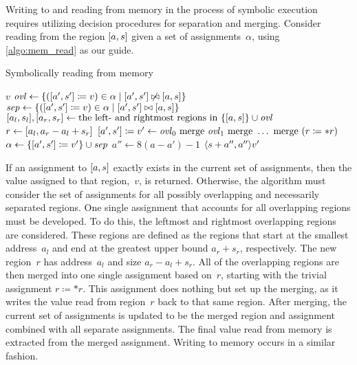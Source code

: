 Writing to and reading from memory in the process of symbolic execution
requires utilizing decision procedures for separation and merging.
Consider reading from the region $[a,s]$ given a set of assignments~$\alpha$,
using \cref{algo:mem_read} as our guide.
\begin{algorithm}
  \caption{Symbolically reading from memory}\label{algo:mem_read}
  \begin{algorithmic}
        \State\Return $v$
      \Else
        \State $\mathit{ovl}\gets\{([a',s']\coloneqq v)\in
          \alpha\mid[a',s']\not\bowtie[a,s]\}$
        \State $\mathit{sep}\gets\{([a',s']\coloneqq v)\in
          \alpha\mid[a',s']\bowtie[a,s]\}$
        \State $[a_l,s_l],[a_r,s_r]\gets
        \text{the left- and rightmost regions in }\{[a,s]\}\cup\mathit{ovl}$
        \State $r\gets[a_l,a_r-a_l+s_r]$
        \State $[a',s']\coloneqq v'\gets
          \mathit{ovl}_0\text{ merge }\mathit{ovl}_1\text{ merge }\ldots\text{ merge }(r\coloneqq *r)$
        \State $\alpha\gets\{[a',s']\coloneqq v'\}\cup\mathit{sep}$
        \State $a''\gets8(a-a')-1$
        \State\Return $\langle s+a'',a''\rangle v'$
      \EndIf
    \EndFunction
  \end{algorithmic}
\end{algorithm}
If an assignment to $[a,s]$ exactly exists in the current set of assignments,
then the value assigned to that region,~$v$, is returned.
Otherwise, the algorithm must consider the set of assignments
for all possibly overlapping and necessarily separated regions.
One single assignment that accounts for all overlapping regions must be developed.
To do this, the leftmost and rightmost overlapping regions are considered.
These regions are defined as the regions that start at the smallest address~$a_l$
and end at the greatest upper bound $a_r+s_r$, respectively.
The new region~$r$ has address~$a_l$ and size $a_r-a_l+s_r$.
All of the overlapping regions are then merged into one single assignment based on~$r$,
starting with the trivial assignment $r\coloneqq *r$.
This assignment does nothing but set up the merging,
as it writes the value read from region~$r$ back to that same region.
After merging, the current set of assignments is updated to be the merged region
and assignment combined with all separate assignments.
The final value read from memory is extracted from the merged assignment.
Writing to memory occurs in a similar fashion.

